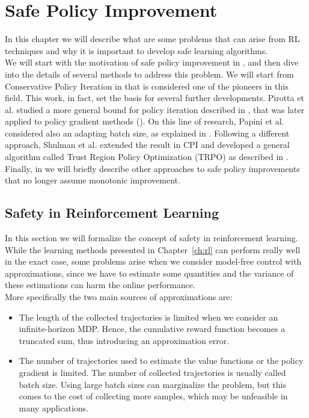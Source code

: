 \chapter{Safe Policy Improvement}
\label{ch:safepg}
\thispagestyle{empty}

In this chapter we will describe what are some problems that can arise from RL techniques and why it is important to develop safe learning algorithms. \\
We will start with the motivation of safe policy improvement in , and then dive into the details of several methods to address this problem. We will start from Conservative Policy Iteration in  that is considered one of the pioneers in this field. This work, in fact, set the basis for several further developments. Pirotta et al. studied a more general bound for policy iteration described in , that was later applied to policy gradient methods (). On this line of research, Papini et al. considered also an adapting batch size, as explained in . Following a different approach, Shulman et al. extended the result in CPI and developed a general algorithm called Trust Region Policy Optimization (TRPO) as described in . Finally, in  we will briefly describe other approaches to safe policy improvements that no longer assume monotonic improvement.

\section{Safety in Reinforcement Learning}
\label{sec:whysafety}
In this section we will formalize the concept of safety in reinforcement learning. While the learning methods presented in Chapter~\ref{ch:rl} can perform really well in the exact case, some problems arise when we consider model-free control with approximations, since we have to estimate some quantities and the variance of these estimations can harm the online performance. \\
More specifically the two main sources of approximations are: 
\begin{itemize}
\item The length of the collected trajectories is limited when we consider an infinite-horizon MDP. Hence, the cumulative reward function becomes a truncated sum, thus introducing an approximation error.
\item The number of trajectories used to estimate the value functions or the policy gradient is limited. The number of collected trajectories is usually called batch size. Using large batch sizes can marginalize the problem, but this comes to the cost of collecting more samples, which may be unfeasible in many applications.
\end{itemize}

